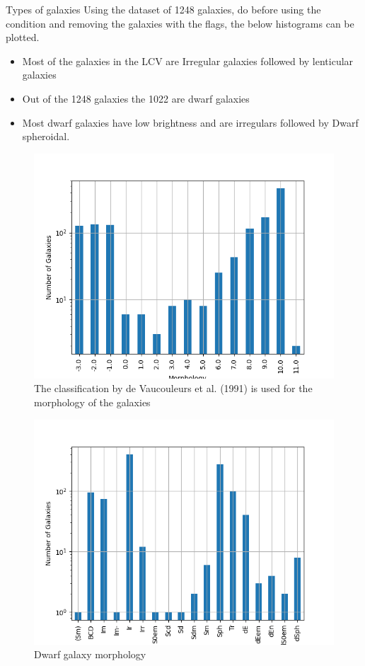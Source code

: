 \documentclass[presentation]{beamer}
\begin{document}
\begin{frame}[label={sec:org236576b}]{Types of galaxies}
Using the dataset of 1248 galaxies, do before using the condition and removing the galaxies with the flags, the below histograms can be plotted.

\begin{itemize}
\item Most of the galaxies in the LCV are Irregular galaxies followed by lenticular galaxies

\item Out of the 1248 galaxies the 1022 are dwarf galaxies

\item Most dwarf galaxies have low brightness and are irregulars followed by Dwarf spheroidal.
\end{itemize}

\begin{figure}[htbp]
\centering
\includegraphics[width=.9\linewidth]{./figs/hist-Type.png}
\caption{\label{Types of galaxies}The classification by de Vaucouleurs et al. (1991) is used for the morphology of the galaxies}
\end{figure}

\begin{figure}[htbp]
\centering
\includegraphics[width=.9\linewidth]{./figs/hist-Tdw1.png}
\caption{\label{Types of dwarf galaxies}Dwarf galaxy morphology}
\end{figure}


\end{frame}
\end{document}

